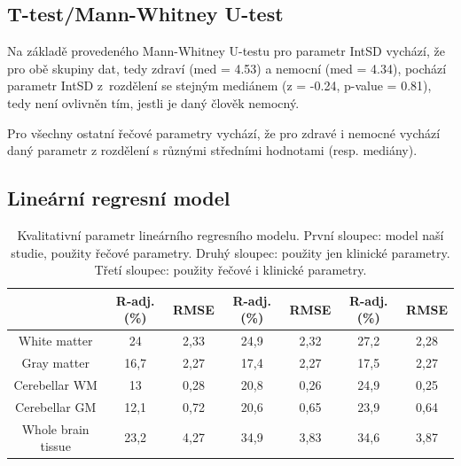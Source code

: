 \documentclass[11pt,a4paper]{article}
\begin{document}
            
        \subsection{T-test/Mann-Whitney U-test}
            Na základě provedeného Mann-Whitney U-testu pro parametr IntSD vychází, že pro obě skupiny dat, tedy zdraví (med = 4.53) a nemocní (med = 4.34), pochází parametr IntSD z~rozdělení se stejným mediánem (z = -0.24, p-value = 0.81), tedy není ovlivněn tím, jestli je daný člověk nemocný.

            Pro všechny ostatní řečové parametry vychází, že pro zdravé i nemocné vychází daný parametr z rozdělení s různými středními hodnotami (resp. mediány).
        
        \subsection{Lineární regresní model}
            \begin{table}[!ht]
                \centering
                \begin{tabular}{c|c c|c c|c c}
                    & R-adj. (\%) & RMSE & R-adj. (\%) & RMSE& R-adj. (\%) & RMSE \\
                    \hline
                    White matter & 24 & 2,33& 24,9 & 2,32& 27,2 & 2,28\\
                    Gray matter & 16,7 & 2,27& 17,4 & 2,27& 17,5 & 2,27\\
                    Cerebellar WM & 13 & 0,28& 20,8 & 0,26& 24,9 & 0,25\\
                    Cerebellar GM & 12,1 & 0,72& 20,6 & 0,65& 23,9 & 0,64\\
                    Whole brain tissue & 23,2 & 4,27& 34,9 & 3,83& 34,6 & 3,87\\
                \end{tabular}
                \caption{Kvalitativní parametr lineárního regresního modelu. První sloupec: model naší studie, použity řečové parametry. Druhý sloupec: použity jen klinické parametry. Třetí sloupec: použity řečové i klinické parametry.}
                \label{tab:fitlm}
            \end{table}
        
\end{document}
